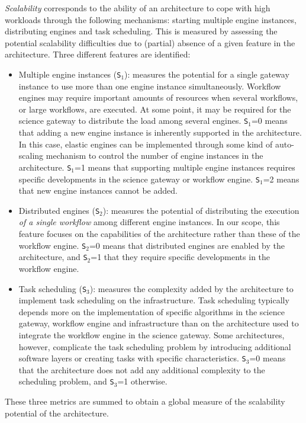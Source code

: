 \documentclass[preprint,3p,twocolumn]{elsarticle}
\begin{document}
\emph{Scalability} corresponds to the ability of an architecture to
cope with high workloads through the following mechanisms: starting multiple engine instances, distributing engines and task scheduling. 
This is measured by assessing the potential
scalability difficulties due to (partial) absence of a given feature in the architecture.  
 Three different features are identified:
\begin{itemize}[leftmargin=0cm,itemindent=0.35cm,itemsep=0cm]
\item Multiple engine instances (\texttt{S$_1$}): measures the
  potential for a single gateway instance to use more than one engine
  instance simultaneously. Workflow engines may require important
  amounts of resources when several workflows, or large workflows, are
  executed. At some point, it may be required for the science gateway
  to distribute the load among several engines. \texttt{S$_1$}=0 means
  that
  adding a new engine instance is inherently supported in the
  architecture. In this case, elastic engines can be implemented
  through some kind of auto-scaling mechanism to control the number of
  engine instances in the architecture. \texttt{S$_1$}=1 means that
  supporting multiple engine instances requires specific developments in the
  science gateway or workflow engine. \texttt{S$_1$}=2 means that new
  engine instances cannot be added.
\item Distributed engines (\texttt{S$_2$}): measures the potential of distributing
  the execution \emph{of a single workflow} among different engine
  instances. In our scope, this feature focuses on the capabilities of
  the architecture rather than these of the workflow
  engine. \texttt{S$_2$}=0 means that distributed engines are enabled by
  the architecture, and \texttt{S$_2$}=1 that they require specific
  developments in the workflow engine. 
\item Task scheduling (\texttt{S$_3$}): measures the complexity
  added by the architecture to implement task scheduling on
  the infrastructure. Task
  scheduling typically depends more on the implementation of specific
  algorithms in the science gateway, workflow engine and
  infrastructure than on the architecture used to integrate the
  workflow engine in the science gateway. Some architectures, however,
  complicate the task scheduling problem by introducing additional
  software layers or creating tasks with specific
  characteristics. \texttt{S$_3$}=0 means that the architecture does
  not add any additional complexity to the scheduling problem,
  and \texttt{S$_3$}=1 otherwise.
\end{itemize}
These three metrics are summed to obtain a global measure of the scalability
potential of the architecture.
\end{document}
